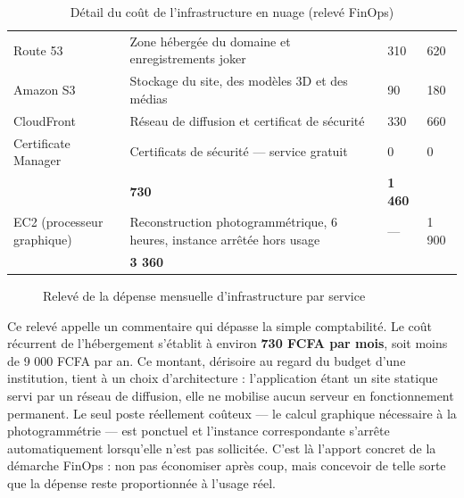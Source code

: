 \begin{table}[htbp]
\centering
\caption{Détail du coût de l'infrastructure en nuage (relevé FinOps)}
\label{tab:finops}
\small
\begin{tabularx}{\textwidth}{|L{3.8cm}|X|R{2.2cm}|R{2.2cm}|}
\hline
{}
 &  &  &  \\ \hline
Route 53 & Zone hébergée du domaine et enregistrements joker & 310 & 620 \\ \hline
Amazon S3 & Stockage du site, des modèles 3D et des médias & 90 & 180 \\ \hline
CloudFront & Réseau de diffusion et certificat de sécurité & 330 & 660 \\ \hline
Certificate Manager & Certificats de sécurité — service gratuit & 0 & 0 \\ \hline
{}
 & \textbf{730} & \textbf{1 460} \\ \hline
EC2 (processeur graphique) & Reconstruction photogrammétrique, 6 heures, instance arrêtée hors usage & — & 1 900 \\ \hline
{}
 & \textbf{3 360} \\ \hline
\end{tabularx}
\end{table}

\begin{figure}[htbp]
\centering
{}
\caption{Relevé de la dépense mensuelle d'infrastructure par service}
\label{fig:finops}
\end{figure}

Ce relevé appelle un commentaire qui dépasse la simple comptabilité. Le coût
récurrent de l'hébergement s'établit à environ \textbf{730 FCFA par mois}, soit
moins de 9 000 FCFA par an. Ce montant, dérisoire au regard du budget d'une
institution, tient à un choix d'architecture : l'application étant un site
statique servi par un réseau de diffusion, elle ne mobilise aucun serveur en
fonctionnement permanent. Le seul poste réellement coûteux — le calcul graphique
nécessaire à la photogrammétrie — est ponctuel et l'instance correspondante
s'arrête automatiquement lorsqu'elle n'est pas sollicitée. C'est là l'apport
concret de la démarche FinOps : non pas économiser après coup, mais concevoir de
telle sorte que la dépense reste proportionnée à l'usage réel.

